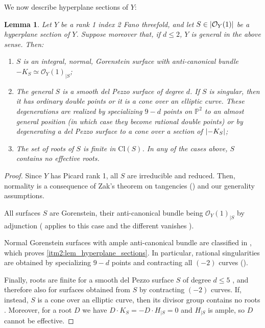 \documentclass[11pt]{amsart}
\newtheorem{lemma}[thm]{Lemma}
\theoremstyle{definition}
\newcommand{\pr}[1]{\mathbb P^{#1}}
\newcommand{\sO}{\mathcal{O}}
\DeclarePairedDelimiter{\abs}{\lvert}{\rvert}
\begin{document}
We now describe hyperplane sections of $Y$:

\begin{lemma}\label{lem_hyperplane_sections}
Let $Y$ be a rank 1 index 2 Fano threefold, and let $S\in \abs{\sO_Y(1)}$ be a hyperplane section of $Y$. Suppose moreover that, if $d\leq 2$, $Y$ is general in the above sense. Then:
\begin{enumerate}
    \item $S$ is an integral, normal, Gorenstein surface with anti-canonical bundle $-K_S\simeq \sO_Y(1)_{|S}$;
    \item \label{itm2:lem_hyperplane_sections} The general $S$ is a smooth del Pezzo surface of degree $d$. If $S$ is singular, then it has ordinary double points or it is a cone over an elliptic curve. These degenerations are realized by specializing $9-d$ points on $\pr 2$ to an almost general position (in which case they become rational double points) or by degenerating a del Pezzo surface to a cone over a section of $\abs{-K_S}$;
    \item The set of roots of $S$ is finite in $\mathrm{Cl}(S)$. In any of the cases above, $S$ contains no effective roots.
\end{enumerate}
\end{lemma}


\begin{proof}
Since $Y$ has Picard rank 1, all $S$ are irreducible and reduced. Then, normality is a consequence of Zak's theorem on tangencies (\cite[Corollary~3.4.19]{positivityI}) and our generality assumptions.

All surfaces $S$ are Gorenstein, their anti-canonical bundle being $\sO_Y(1)_{|S}$ by adjunction (\cite[\S 4.1]{Kol13} applies to this case and the different vanishes \cite[Proposition~4.5(1)]{Kol13}). 

Normal Gorenstein surfaces with ample anti-canonical bundle are classified in \cite{hidaka1981}, which proves \eqref{itm2:lem_hyperplane_sections}. In particular, rational singularities are obtained by specializing $9-d$ points and contracting all $(-2)$ curves (\cite[\S 3]{hidaka1981}). 

Finally, roots are finite for a smooth del Pezzo surface $S$ of degree $d\leq 5$ \cite[\S 8.2.3]{Dol12}, and therefore also for surfaces obtained from $S$ by contracting $(-2)$ curves. If, instead, $S$ is a cone over an elliptic curve, then its divisor group contains no roots \cite[Proposition~3.14]{Kol13}. Moreover, for a root $D$ we have $D\cdot K_S=-D\cdot H_{|S}=0$ and $H_{|S}$ is ample, so $D$ cannot be effective. 
\end{proof}
\end{document}
